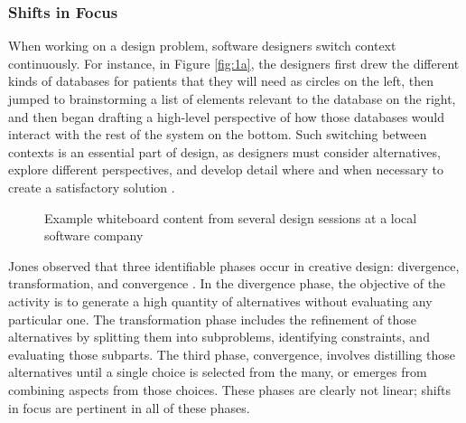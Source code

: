\subsubsection{Shifts in Focus}
\label{behaviorsofsoftwaredesignerswhilesketching:1}

When working on a design problem, software designers switch context continuously. For instance, in Figure \ref{fig:1a}, the designers first drew the different kinds of databases for patients that they will need as circles on the left, then jumped to brainstorming a list of elements relevant to the database on the right, and then began drafting a high-level perspective of how those databases would interact with the rest of the system on the bottom. Such switching between contexts is an essential part of design, as designers must consider alternatives, explore different perspectives, and develop detail where and when necessary to create a satisfactory solution \citep{petre2009insights,myers2008designers,zannier2007comparing}.

\begin{figure}
  \centering


 
\caption{Example whiteboard content from several design sessions at a local software company}
\label{fig:1}       %
\end{figure}
%

Jones observed that three identifiable phases occur in creative design: divergence, transformation, and convergence \citep{jones1992design}. In the divergence phase, the objective of the activity is to generate a high quantity of alternatives without evaluating any particular one. The transformation phase includes the refinement of those alternatives by splitting them into subproblems, identifying constraints, and evaluating those subparts. The third phase, convergence, involves distilling those alternatives until a single choice is selected from the many, or emerges from combining aspects from those choices. These phases are clearly not linear; shifts in focus are pertinent in all of these phases. 

